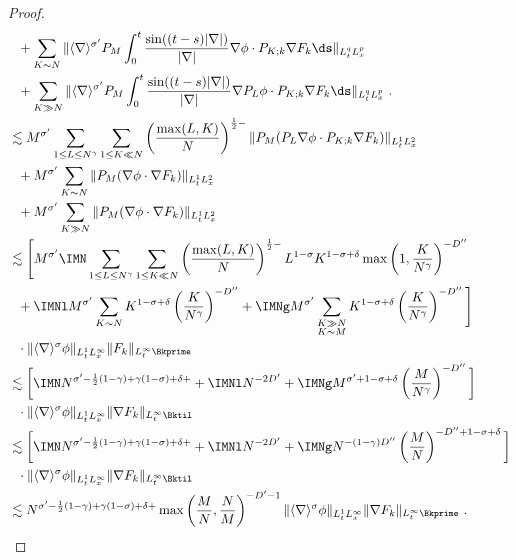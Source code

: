 \documentclass[11pt]{article}
\begin{document}
\begin{proof}
\begin{align*}
&~~+ \sum_{K\sim N} \| \langle \nabla \rangle^{\sigma^\prime} P_M \int_0^t \frac{\sin((t-s)|\nabla|)}{|\nabla|} \nabla  \phi \cdot P_{K;k} \nabla F_k \ds \|_{L_t^q L_x^p}\\
&~~+ \sum_{K\gg N} \| \langle \nabla \rangle^{\sigma^\prime} P_M \int_0^t \frac{\sin((t-s)|\nabla|)}{|\nabla|} \nabla P_L \phi \cdot P_{K;k} \nabla F_k \ds \|_{L_t^q L_x^p}~. \\
&\lesssim M^{\sigma^\prime} \sum_{1\leq L \leq N^\gamma} \sum_{1\leq K \ll N} \left( \frac{\max(L,K)}{N} \right)^{\frac{1}{2}-} \| P_M ( P_L \nabla \phi \cdot P_{K;k} \nabla F_{k} )\|_{L_t^1L_x^2} \\
&~~+ M^{\sigma^\prime} \sum_{K\sim N} \| P_M( \nabla \phi \cdot \nabla F_k ) \|_{L_t^1L_x^2} \\
&~~ + M^{\sigma^\prime} \sum_{K\gg N} \| P_M(\nabla \phi \cdot \nabla F_k) \|_{L_t^1 L_x^2}\\
&\lesssim  \Bigg[ M^{\sigma^\prime} \IMN \sum_{1\leq L \leq N^\gamma} \sum_{1\leq K \ll N } \left( \frac{\max(L,K)}{N} \right)^{\frac{1}{2}-} L^{1-\sigma} K^{1-\sigma+\delta} \max\left( 1, \frac{K}{N^\gamma} \right)^{-D^{\prime\prime}}  \\
&~~+ \IMNl M^{\sigma^\prime} \sum_{K\sim N} K^{1-\sigma+\delta} \left( \frac{K}{N^\gamma} \right)^{-D^{\prime\prime}} + \IMNg M^{\sigma^\prime} \sum_{\substack{ K \gg N\\ K \sim M}} K^{1-\sigma+\delta} 
\left( \frac{K}{N^\gamma} \right)^{-D^{\prime\prime}} \Bigg]\\
&~~\cdot \| \langle \nabla \rangle^\sigma \phi \|_{L_t^1 L_x^\infty} \| F_k \|_{L_t^\infty \Bkprime} \\
&\lesssim \bigg[ \IMN N^{\sigma^\prime-\frac{1}{2} (1-\gamma) + \gamma (1-\sigma) + \delta + } +
\IMNl N^{-2D^\prime}  + \IMNg M^{\sigma^\prime+1-\sigma+\delta} \left( \frac{M}{N^\gamma} \right)^{-D^{\prime\prime}} \bigg]\\ 
&~~\cdot \| \langle \nabla \rangle^\sigma \phi \|_{L_t^1 L_x^\infty} \|  \nabla F_k \|_{L_t^\infty \Bktil} \\
&\lesssim \bigg[ \IMN N^{\sigma^\prime-\frac{1}{2} (1-\gamma) + \gamma (1-\sigma) + \delta + } +
\IMNl N^{-2D^\prime}  + \IMNg N^{-(1-\gamma)D^{\prime\prime}} \left( \frac{M}{N} \right)^{-D^{\prime\prime}+1-\sigma+\delta} \bigg]\\ 
&~~\cdot \| \langle \nabla \rangle^\sigma \phi \|_{L_t^1 L_x^\infty} \|  \nabla F_k \|_{L_t^\infty \Bktil} \\
&\lesssim  N^{\sigma^\prime-\frac{1}{2} (1-\gamma) + \gamma (1-\sigma) + \delta + } \max \left( \frac{M}{N}, \frac{N}{M} \right)^{-D^\prime-1} \| \langle \nabla \rangle^\sigma \phi \|_{L_t^1 L_x^\infty} \| \nabla F_k \|_{L_t^\infty \Bkprime} ~.

\end{align*}
\end{proof}
\end{document}
